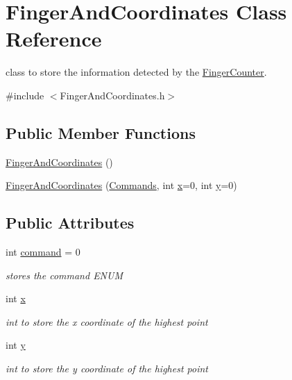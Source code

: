 \hypertarget{classFingerAndCoordinates}{}\section{Finger\+And\+Coordinates Class Reference}
\label{classFingerAndCoordinates}


class to store the information detected by the \hyperlink{classFingerCounter}{Finger\+Counter}.  




{\ttfamily \#include $<$Finger\+And\+Coordinates.\+h$>$}

\subsection*{Public Member Functions}
\begin{DoxyCompactItemize}
\item 
\hyperlink{classFingerAndCoordinates_a9d24b8b3b3237f0a39762a52daf6f6a5}{Finger\+And\+Coordinates} ()
\item 
\hyperlink{classFingerAndCoordinates_a907ced00a2a2075194c38b9a356bfb60}{Finger\+And\+Coordinates} (\hyperlink{Commands_8h_a1939e90743463fb34c8c571ec0590430}{Commands}, int \hyperlink{classFingerAndCoordinates_ac68efb78d744788be7e3105627fe9320}{x}=0, int \hyperlink{classFingerAndCoordinates_a7a5165f9b4a0304ceb8bdcd5f35c2c77}{y}=0)
\end{DoxyCompactItemize}
\subsection*{Public Attributes}
\begin{DoxyCompactItemize}
\item 
int \hyperlink{classFingerAndCoordinates_af94d8ca7cd08d7144ec919fa997120c0}{command} = 0
\begin{DoxyCompactList}\small\item\em stores the command E\+N\+UM \end{DoxyCompactList}\item 
int \hyperlink{classFingerAndCoordinates_ac68efb78d744788be7e3105627fe9320}{x}
\begin{DoxyCompactList}\small\item\em int to store the x coordinate of the highest point \end{DoxyCompactList}\item 
int \hyperlink{classFingerAndCoordinates_a7a5165f9b4a0304ceb8bdcd5f35c2c77}{y}
\begin{DoxyCompactList}\small\item\em int to store the y coordinate of the highest point \end{DoxyCompactList}\end{DoxyCompactItemize}


